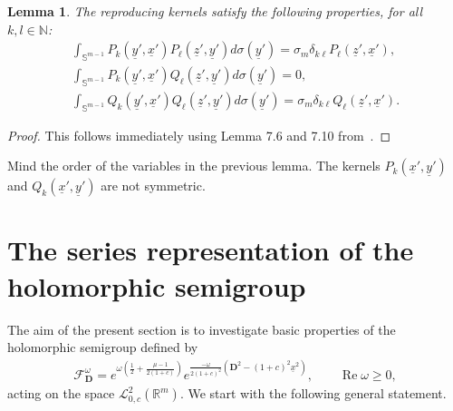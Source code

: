 \documentclass[11pt]{article}
\newtheorem{lemma}{Lemma}
\numberwithin{equation}{section}
\numberwithin{theorem}{section}
\numberwithin{proposition}{section}
\numberwithin{lemma}{section}
\numberwithin{corollary}{section}
\numberwithin{definition}{section}
\numberwithin{example}{section}
\numberwithin{remark}{section}
\numberwithin{note}{section}
\theoremstyle{remark}
\newcommand{\mR}{\mathbb{R}}
\newcommand{\mN}{\mathbb{N}}
\newcommand{\mS}{\mathbb{S}}
\newcommand{\cF}{\mathcal{F}}
\newcommand{\cL}{\mathcal{L}}
\newcommand{\dD}{\textbf{D}}
\newcommand{\ux}{\underline{x}}
\newcommand{\uz}{\underline{z}}
\newcommand{\uy}{\underline{y}}
\def\o{{\omega}}
\def\s{{\sigma}}
\begin{document}
\begin{lemma}
\label{ReprKernOrth}
The reproducing kernels satisfy the following properties, for all $k,l\in\mN$:
\begin{gather*}
\int_{\mS^{m-1}} P_{k}(\uy', \ux') P_{\ell}(\uz', \uy') d \s (\uy') = \sigma_m \delta_{k \ell
}P_{\ell}( \uz', \ux'),\\
\int_{\mS^{m-1}} P_{k}( \uy', \ux') Q_{\ell}( \uz', \uy') d \s (\uy') = 0,\\
\int_{\mS^{m-1}} Q_{k}( \uy', \ux') Q_{\ell}(\uz', \uy') d \s (\uy') = \sigma_m \delta_{k \ell }
Q_{\ell}(\uz', \ux').
\end{gather*}
\end{lemma}

\begin{proof}
This follows immediately using Lemma 7.6 and 7.10 from~\cite{DBXu}.
\end{proof}

\begin{remark}
Mind the order of the variables in the previous lemma.
The kernels $P_{k}(\ux',\uy')$ and $Q_{k}(\ux',\uy')$ are not symmetric.
\end{remark}

\section{The series representation of the holomorphic semigroup}\label{section6}

The aim of the present section is to investigate basic properties of the holomorphic semigroup
def\/ined by
\begin{gather*}
\cF_{\dD}^{\o}=e^{\o\left(\frac{1}{2}+\frac{\mu-1}{2(1+c)}\right)}e^{\frac{-\o}{
2(1+c)^{2}}\left(\dD^{2}-(1+c)^{2}\ux^{2}\right)},\qquad\operatorname{Re}\o\geq0,
\end{gather*}
acting on the space $\cL^{2}_{0,c}(\mR^{m})$.
We start with the following general statement.
\end{document}
